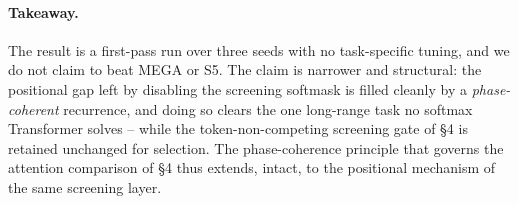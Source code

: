 \documentclass[11pt,a4paper]{article}
\theoremstyle{plain}
\theoremstyle{definition}
\begin{document}
\paragraph{Takeaway.}
The result is a first-pass run over three seeds with no task-specific tuning,
and we do not claim to beat MEGA or S5. The claim is narrower and structural:
the positional gap
left by disabling the screening softmask is filled cleanly by a
\emph{phase-coherent} recurrence, and doing so clears the one long-range task no
softmax Transformer solves -- while the token-non-competing screening gate of
\S{}4 is retained unchanged for selection. The phase-coherence principle that
governs the attention comparison of \S{}4 thus extends, intact, to the
positional mechanism of the same screening layer.

\medskip
\end{document}
